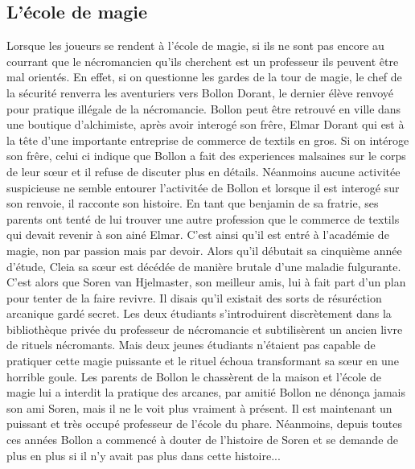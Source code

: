 

\subsection{L'école de magie}

Lorsque les joueurs se rendent à l'école de magie, si ils ne sont pas encore au courrant que le nécromancien
qu'ils cherchent est un professeur ils peuvent être mal orientés. En effet, si on questionne les gardes de
la tour de magie, le chef de la sécurité renverra les aventuriers vers Bollon Dorant, le dernier élève 
renvoyé 
pour pratique illégale de la nécromancie. Bollon peut être retrouvé en ville dans une boutique d'alchimiste,
après avoir interogé son frêre, Elmar Dorant qui est à la tête d'une importante
entreprise de commerce de textils en gros. Si on intéroge son frêre, celui ci indique que Bollon a fait des 
experiences malsaines sur le corps de leur s\oe{}ur et il refuse de discuter plus en détails. Néanmoins 
aucune activitée suspicieuse ne semble entourer l'activitée de Bollon et 
lorsque il est interogé sur son renvoie, il racconte son histoire. En tant que benjamin de sa fratrie, ses
parents ont tenté de lui trouver une autre profession que le commerce de textils qui devait revenir à son 
ainé Elmar. C'est ainsi qu'il est entré à l'académie de magie, non par passion mais par devoir. Alors qu'il
débutait sa cinquième année d'étude, Cleia sa s\oe{}ur est décédée de manière brutale d'une maladie 
fulgurante. C'est alors que Soren van Hjelmaster, son meilleur amis, lui à fait part d'un plan pour
tenter de la faire revivre. Il disais qu'il existait des sorts de résuréction arcanique gardé secret. Les
deux étudiants s'introduirent discrètement dans la bibliothèque privée du professeur de nécromancie et 
subtilisèrent un ancien livre de rituels nécromants. Mais deux jeunes étudiants n'étaient pas capable
de pratiquer cette magie puissante et le rituel échoua transformant sa s\oe{}ur en une horrible goule. 
Les parents de Bollon le chassèrent de la maison et l'école de magie lui a interdit la pratique des
arcanes, par amitié Bollon ne dénonça jamais son ami Soren, mais il ne le voit plus vraiment à présent.
Il est maintenant un puissant et très occupé professeur de l'école du phare. Néanmoins, depuis toutes 
ces années Bollon
a commencé à douter de l'histoire de Soren et se demande de plus en plus si il n'y avait pas plus dans 
cette histoire...

